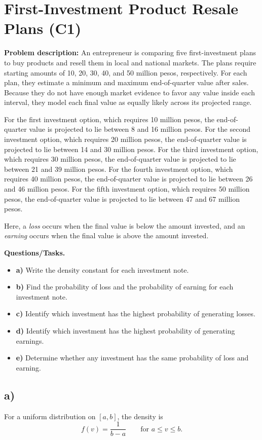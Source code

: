 \section{First-Investment Product Resale Plans (C1)}

\textbf{Problem description:}
An entrepreneur is comparing five first-investment plans to buy products and resell them in local and national markets. The plans require starting amounts of 10, 20, 30, 40, and 50 million pesos, respectively. For each plan, they estimate a minimum and maximum end-of-quarter value after sales. Because they do not have enough market evidence to favor any value inside each interval, they model each final value as equally likely across its projected range.

For the first investment option, which requires 10 million pesos, the end-of-quarter value is projected to lie between 8 and 16 million pesos. For the second investment option, which requires 20 million pesos, the end-of-quarter value is projected to lie between 14 and 30 million pesos. For the third investment option, which requires 30 million pesos, the end-of-quarter value is projected to lie between 21 and 39 million pesos. For the fourth investment option, which requires 40 million pesos, the end-of-quarter value is projected to lie between 26 and 46 million pesos. For the fifth investment option, which requires 50 million pesos, the end-of-quarter value is projected to lie between 47 and 67 million pesos.

Here, a \emph{loss} occurs when the final value is below the amount invested, and an \emph{earning} occurs when the final value is above the amount invested.

\textbf{Questions/Tasks.}
\begin{itemize}
	\item \textbf{a)} Write the density constant for each investment note.
	\item \textbf{b)} Find the probability of loss and the probability of earning for each investment note.
	\item \textbf{c)} Identify which investment has the highest probability of generating losses.
	\item \textbf{d)} Identify which investment has the highest probability of generating earnings.
	\item \textbf{e)} Determine whether any investment has the same probability of loss and earning.
\end{itemize}

\subsection*{a)}
For a uniform distribution on $[a,b]$, the density is
\[
f(v)=\frac{1}{b-a}\qquad \text{for }a\le v\le b.
\]

